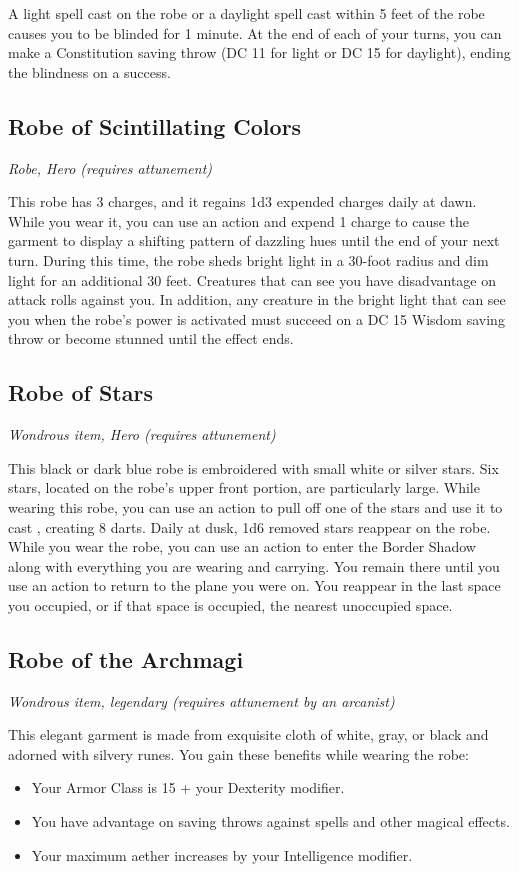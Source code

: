 A light spell cast on the robe or a daylight spell cast within 5 feet of the robe causes you to be blinded for 1 minute. At the end of each of your turns, you can make a Constitution saving throw (DC 11 for light or DC 15 for daylight), ending the blindness on a success.

\subsection{Robe of Scintillating Colors}
\textit{Robe, Hero (requires attunement)}

This robe has 3 charges, and it regains 1d3 expended charges daily at dawn. While you wear it, you can use an action and expend 1 charge to cause the garment to display a shifting pattern of dazzling hues until the end of your next turn. During this time, the robe sheds bright light in a 30-foot radius and dim light for an additional 30 feet. Creatures that can see you have disadvantage on attack rolls against you. In addition, any creature in the bright light that can see you when the robe's power is activated must succeed on a DC 15 Wisdom saving throw or become stunned until the effect ends.

\subsection{Robe of Stars}
\textit{Wondrous item, Hero (requires attunement)}

This black or dark blue robe is embroidered with small white or silver stars. Six stars, located on the robe's upper front portion, are particularly large. While wearing this robe, you can use an action to pull off one of the stars and use it to cast , creating 8 darts. Daily at dusk, 1d6 removed stars reappear on the robe.  While you wear the robe, you can use an action to enter the Border Shadow along with everything you are wearing and carrying. You remain there until you use an action to return to the plane you were on. You reappear in the last space you occupied, or if that space is occupied, the nearest unoccupied space.

\subsection{Robe of the Archmagi}
\textit{Wondrous item, legendary (requires attunement by an arcanist)}

This elegant garment is made from exquisite cloth of white, gray, or black and adorned with silvery runes. You gain these benefits while wearing the robe:
\begin{itemize}
    \item Your Armor Class is 15 + your Dexterity modifier.
    \item You have advantage on saving throws against spells and other magical effects.
    \item Your maximum aether increases by your Intelligence modifier.
\end{itemize}

